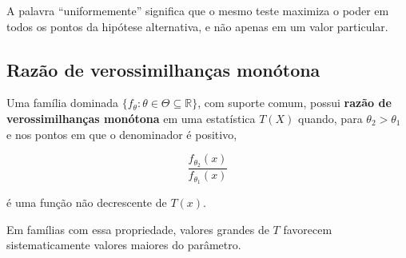 \documentclass[
  letterpaper,
  DIV=11,
  numbers=noendperiod]{scrreprt}
\begin{document}
A palavra ``uniformemente'' significa que o mesmo teste maximiza o poder
em todos os pontos da hipótese alternativa, e não apenas em um valor
particular.

\subsection{Razão de verossimilhanças
monótona}\label{razuxe3o-de-verossimilhanuxe7as-monuxf3tona}

\begin{tcolorbox}[enhanced jigsaw, colback=white, leftrule=.75mm, colbacktitle=quarto-callout-note-color!10!white, breakable, titlerule=0mm, bottomtitle=1mm, title=\textcolor{quarto-callout-note-color}{\faInfo}\hspace{0.5em}{Definição}, colframe=quarto-callout-note-color-frame, toprule=.15mm, opacityback=0, bottomrule=.15mm, opacitybacktitle=0.6, arc=.35mm, toptitle=1mm, rightrule=.15mm, coltitle=black, left=2mm]

Uma família dominada
\(\{f_\theta:\theta\in\Theta\subseteq\mathbb{R}\}\), com suporte comum,
possui \textbf{razão de verossimilhanças monótona} em uma estatística
\(T(X)\) quando, para \(\theta_2>\theta_1\) e nos pontos em que o
denominador é positivo,

\[\frac{f_{\theta_2}(x)}{f_{\theta_1}(x)}\]

é uma função não decrescente de \(T(x)\).

\end{tcolorbox}

Em famílias com essa propriedade, valores grandes de \(T\) favorecem
sistematicamente valores maiores do parâmetro.
\end{document}
